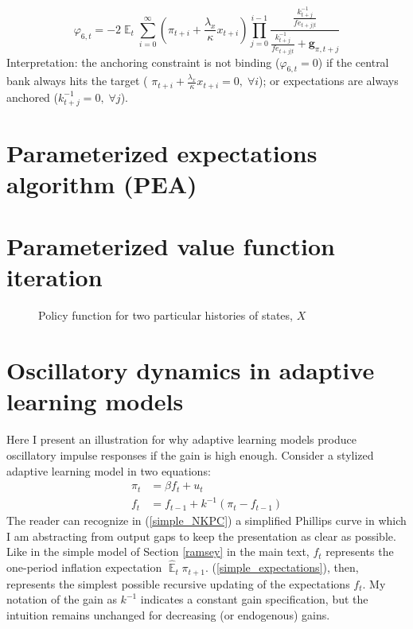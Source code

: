 \documentclass[11pt]{article}
\def \myFigPath {../../figures/}
\renewcommand{\[}{\begin{equation}}
\renewcommand{\]}{\end{equation}}
\DeclareMathOperator{\E}{\mathbb{E}}
\begin{document}
\begin{equation}
\varphi_{6,t} = -2\E_t\sum_{i=0}^{\infty}(\pi_{t+i}+\frac{\lambda_x}{\kappa}x_{t+i})\prod_{j=0}^{i-1}\frac{\frac{k_{t+j}^{-1}}{fe_{t+j|t}}}{\frac{k_{t+j}^{-1}}{fe_{t+j|t}} + \mathbf{g}_{\pi,t+j}} \label{sol1'}
\end{equation}
Interpretation: the anchoring constraint is not binding ($\varphi_{6,t}=0$) if the central bank always hits the target (
$\pi_{t+i}+\frac{\lambda_x}{\kappa}x_{t+i} = 0, \; \forall i$); or expectations are always anchored ($k_{t+j}^{-1}=0, \; \forall j$). 

\section{Parameterized expectations algorithm (PEA)} \label{pea}

\section{Parameterized value function iteration} \label{vfi}

\begin{figure}[h!]
\caption{Policy function for two particular histories of states, $X$}
\end{figure}

\section{Oscillatory dynamics in adaptive learning models} \label{app_oscillations}
Here I present an illustration for why adaptive learning models produce oscillatory impulse responses if the gain is high enough. Consider a stylized adaptive learning model in two equations:
\begin{align}
\pi_t & = \beta f_t + u_t \label{simple_NKPC} \\
f_t & = f_{t-1} + k^{-1}(\pi_t - f_{t-1}) \label{simple_expectations}
\end{align}
The reader can recognize in (\ref{simple_NKPC}) a simplified Phillips curve in which I am abstracting from output gaps to keep the presentation as clear as possible. Like in the simple model of Section \ref{ramsey} in the main text, $f_t$ represents the one-period inflation expectation $\hat{\E}_t \pi_{t+1}$. (\ref{simple_expectations}), then, represents the simplest possible recursive updating of the expectations $f_t$. My notation of the gain as $k^{-1}$ indicates a constant gain specification, but the intuition remains unchanged for decreasing (or endogenous) gains. 
\end{document}
